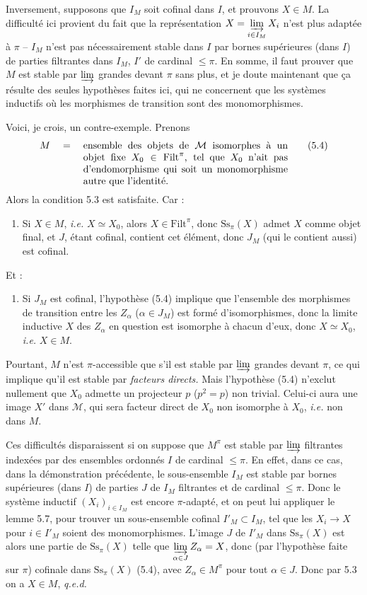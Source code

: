 \documentclass[11pt]{article}
\newcommand{\msp}[1]{\marginpar{\footnotesize [#1]}}
\newcommand{\cM}{\mathcal{M}}
\newcommand{\Filt}{\mathrm{Filt}}
\newcommand{\Ss}{\mathrm{Ss}}
\begin{document}
Inversement, supposons que $I_M$ soit cofinal dans $I$, et prouvons $X \in M$. La difficulté ici provient du fait que la représentation $X = \varinjlim\limits_{i\in I_M} X_i$ n'est plus adaptée à $\pi$ -- $I_M$ n'est pas nécessairement stable dans $I$ par bornes supérieures (dans $I$) de parties filtrantes dans $I_M$, $I'$ de cardinal $\leq \pi$. En somme, il faut
\msp{page 54}
prouver que $M$ est stable par $\varinjlim$ grandes devant $\pi$ sans plus, et je doute maintenant que ça résulte des seules hypothèses faites ici, qui ne concernent que les systèmes inductifs où les morphismes de transition sont des monomorphismes.

Voici, je crois, un contre-exemple. Prenons
\[
M \quad = \quad \parbox[t]{0.6\textwidth}{ensemble des objets de $\cM$ isomorphes à un objet fixe $X_0 \in \Filt^{\pi}$, tel que $X_0$ n'ait pas d'endomorphisme qui soit un monomorphisme autre que l'identité.}
\tag*{(5.4)}
\]
Alors la condition 5.3 est satisfaite. Car :
\begin{enumerate}[nosep]
\item[\textit{a})] Si $X \in M$, \textit{i.e.} $X \simeq X_0$, alors $X \in \Filt^{\pi}$, donc $\Ss_{\pi}(X)$ admet $X$ comme objet final, et $J$, étant cofinal, contient cet élément, donc $J_M$ (qui le contient aussi) est cofinal.
\end{enumerate}
Et :
\begin{enumerate}[nosep]
\item[\textit{b})] Si $J_M$ est cofinal, l'hypothèse (5.4) implique que l'ensemble des morphismes de transition entre les $Z_{\alpha}$ ($\alpha \in J_M$) est formé d'isomorphismes, donc la limite inductive $X$ des $Z_{\alpha}$ en question est isomorphe à chacun d'eux, donc $X \simeq X_0$, \textit{i.e.} $X \in M$.
\end{enumerate}
Pourtant, $M$ n'est $\pi$-accessible que s'il est stable par $\varinjlim$ grandes devant $\pi$, ce qui implique qu'il est stable par \textit{facteurs directs.} Mais l'hypothèse
\msp{page 55}
(5.4) n'exclut nullement que $X_0$ admette un projecteur $p$ ($p^{2} = p$) non trivial. Celui-ci aura une image $X'$ dans $\cM$, qui sera facteur direct de $X_0$ non isomorphe à $X_0$, \textit{i.e.} non dans $M$.

Ces difficultés disparaissent si on suppose que $M^{\pi}$ est stable par $\varinjlim$ filtrantes indexées par des ensembles ordonnés $I$ de cardinal $\leq \pi$. En effet, dans ce cas, dans la démonstration précédente, le sous-ensemble $I_M$ est stable par bornes supérieures (dans $I$) de parties $J$ de $I_M$ filtrantes et de cardinal $\leq \pi$. Donc le système inductif $(X_i)_{i\in I_M}$ est encore $\pi$-adapté, et on peut lui appliquer le lemme 5.7, pour trouver un sous-ensemble cofinal $I'_M \subset I_M$, tel que les $X_i \longrightarrow X$ pour $i \in I'_M$ soient des monomorphismes. L'image $J$ de $I'_M$ dans $\Ss_{\pi}(X)$ est alors une partie de $\Ss_{\pi}(X)$ telle que $\varinjlim\limits_{\alpha\in J} Z_{\alpha} = X$, donc (par l'hypothèse faite sur $\pi$) cofinale dans $\Ss_{\pi}(X)$ (5.4), avec $Z_{\alpha} \in M^{\pi}$ pour tout $\alpha \in J$. Donc par 5.3 on a $X \in M$, \textit{q.e.d.}
\end{document}
